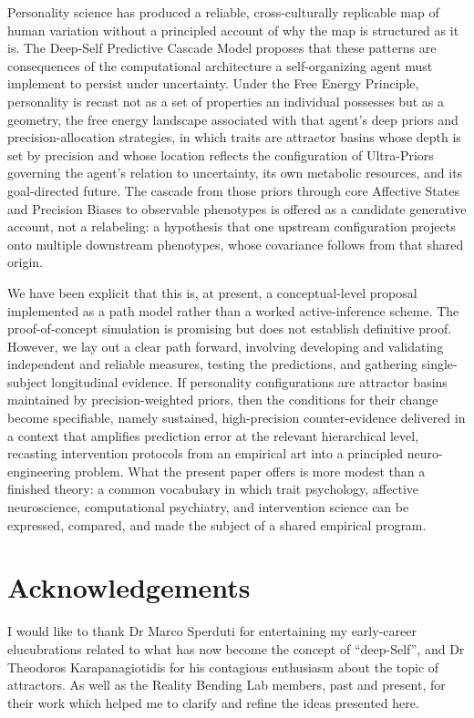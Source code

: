 \documentclass[
  jou,
  floatsintext,
  longtable,
  nolmodern,
  notxfonts,
  notimes,
  12pt,
  colorlinks=true,linkcolor=blue,citecolor=blue,urlcolor=blue]{apa7}
\begin{document}
Personality science has produced a reliable, cross-culturally replicable
map of human variation without a principled account of why the map is
structured as it is. The Deep-Self Predictive Cascade Model proposes
that these patterns are consequences of the computational architecture a
self-organizing agent must implement to persist under uncertainty. Under
the Free Energy Principle, personality is recast not as a set of
properties an individual possesses but as a geometry, the free energy
landscape associated with that agent's deep priors and
precision-allocation strategies, in which traits are attractor basins
whose depth is set by precision and whose location reflects the
configuration of Ultra-Priors governing the agent's relation to
uncertainty, its own metabolic resources, and its goal-directed future.
The cascade from those priors through core Affective States and
Precision Biases to observable phenotypes is offered as a candidate
generative account, not a relabeling: a hypothesis that one upstream
configuration projects onto multiple downstream phenotypes, whose
covariance follows from that shared origin.

We have been explicit that this is, at present, a conceptual-level
proposal implemented as a path model rather than a worked
active-inference scheme. The proof-of-concept simulation is promising
but does not establish definitive proof. However, we lay out a clear
path forward, involving developing and validating independent and
reliable measures, testing the predictions, and gathering single-subject
longitudinal evidence. If personality configurations are attractor
basins maintained by precision-weighted priors, then the conditions for
their change become specifiable, namely sustained, high-precision
counter-evidence delivered in a context that amplifies prediction error
at the relevant hierarchical level, recasting intervention protocols
from an empirical art into a principled neuro-engineering problem. What
the present paper offers is more modest than a finished theory: a common
vocabulary in which trait psychology, affective neuroscience,
computational psychiatry, and intervention science can be expressed,
compared, and made the subject of a shared empirical program.

\section{Acknowledgements}\label{acknowledgements}

I would like to thank Dr Marco Sperduti for entertaining my early-career
elucubrations related to what has now become the concept of
``deep-Self'', and Dr Theodoros Karapanagiotidis for his contagious
enthusiasm about the topic of attractors. As well as the Reality Bending
Lab members, past and present, for their work which helped me to clarify
and refine the ideas presented here.
\end{document}
